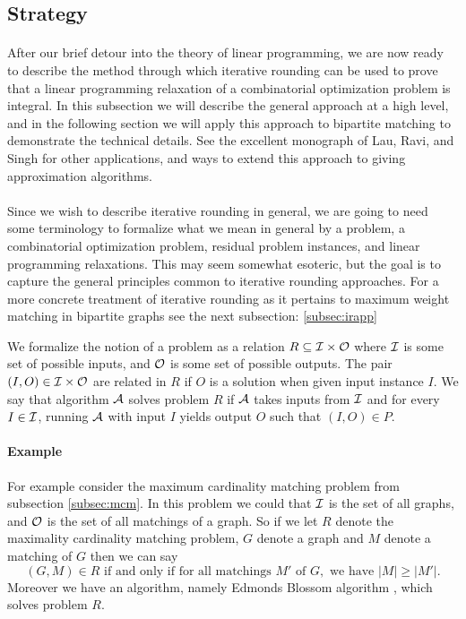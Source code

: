 \subsection{Strategy}
\paragraph{}
After our brief detour into the theory of linear programming, we are now ready to describe the method through which iterative rounding can be used to prove that a linear programming relaxation of a combinatorial optimization problem is integral. In this subsection we will describe the general approach at a high level, and in the following section we will apply this approach to bipartite matching to demonstrate the technical details. See the excellent monograph of Lau, Ravi, and Singh\cite{lau2011iterative} for other applications, and ways to extend this approach to giving approximation algorithms.
\paragraph{}
Since we wish to describe iterative rounding in general, we are going to need some terminology to formalize what we mean in general by a problem, a combinatorial optimization problem, residual problem instances, and linear programming relaxations. This may seem somewhat esoteric, but the goal is to capture the general principles common to iterative rounding approaches. For a more concrete treatment of iterative rounding as it pertains to maximum weight matching in bipartite graphs see the next subsection: \ref{subsec:irapp}
\begin{definition}
We formalize the notion of a problem as a relation $R \subseteq \mathcal{I} \times \mathcal{O}$ where $\mathcal{I}$ is some set of possible inputs, and $\mathcal{O}$ is some set of possible outputs. The pair $(I,O) \in \mathcal{I} \times \mathcal{O}$ are related in $R$ if $O$ is a solution when given input instance $I$. We say that algorithm $\mathcal{A}$ solves problem $R$ if $\mathcal{A}$ takes inputs from $\mathcal{I}$ and for every $I \in \mathcal{I}$, running $\mathcal{A}$ with input $I$ yields output $O$ such that $(I,O) \in P$. 
\end{definition}
\paragraph{Example}
For example consider the maximum cardinality matching problem from subsection \ref{subsec:mcm}. In this problem we could that $\mathcal{I}$ is the set of all graphs, and $\mathcal{O}$ is the set of all matchings of a graph. So if we let $R$ denote the maximality cardinality matching problem, $G$ denote a graph and $M$ denote a matching of $G$ then we can say $$(G,M) \in R \text{ if and only if for all matchings } M'\text{ of } G, \text{ we have } |M| \geq |M'|.$$
Moreover we have an algorithm, namely Edmonds Blossom algorithm \cite{edmonds1965paths}, which solves problem $R$.
